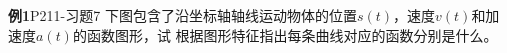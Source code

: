\begin{frame}
	\linespread{1.2}
	\begin{exampleblock}{{\bf 例1}\hfill P211-习题7}
	下图包含了沿坐标轴轴线运动物体的位置$s(t)$，速度$v(t)$和加速度$a(t)$的函数图形，试
	根据图形特征指出每条曲线对应的函数分别是什么。
	\begin{center}
	\end{center}
	\end{exampleblock}
\end{frame}



